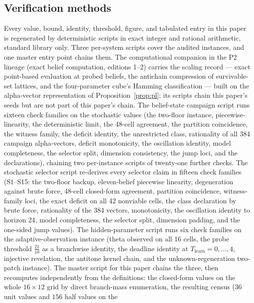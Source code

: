 \documentclass[10pt,twocolumn]{article}
\theoremstyle{plain}
\theoremstyle{definition}
\theoremstyle{remark}
\begin{document}
\subsection{Verification methods}\label{methods}

Every value, bound, identity, threshold, figure, and tabulated entry in
this paper is regenerated by deterministic scripts in exact integer and
rational arithmetic, standard library only. Three per-system scripts
cover the audited instances, and one master entry point chains them.
The computational companion in the P2 lineage (exact belief
computation, editions 1--2) carries the scaling record --- exact
point-based evaluation at probed beliefs, the antichain compression of
survivable-set lattices, and the four-parameter cube's Hamming
classification --- built on the alpha-vector representation of
Proposition~\ref{prop:pl}; its scripts chain this paper's seeds but
are not part of this paper's chain.
The belief-state campaign script runs sixteen check families on the
stochastic values (the two-floor instance, piecewise-linearity, the
deterministic limit, the 48-cell agreement, the partition coincidence,
the witness family, the deficit identity, the unrestricted class,
rationality of all 384 campaign alpha-vectors, deficit monotonicity, the
oscillation identity, model completeness, the selector split, dimension
consistency, the jump loci, and the declarations), chaining two
per-instance scripts of twenty-one further checks. The stochastic
selector script re-derives every selector claim in fifteen check
families (S1--S15: the two-floor backup, eleven-belief piecewise
linearity, degeneration against brute force, 48-cell closed-form
agreement, partition coincidence, witness-family loci, the exact
deficit on all 42 nonviable cells, the class declaration by brute
force, rationality of the 384 vectors, monotonicity, the oscillation
identity to horizon 24, model completeness, the selector split,
dimension padding, and the one-sided jump values). The hidden-parameter
script runs six check families on the adaptive-observation instance
(theta observed on all 16 cells, the probe threshold
\(\tfrac{21}{10}\) as a branchwise identity, the deadline identity at
\(T_{\mathrm{learn}} = 0, \dots, 4\), injective revelation, the
antitone kernel chain, and the unknown-regeneration two-patch
instance). The master script for this paper chains the three, then
recomputes independently from the definitions: the closed-form values on
the whole \(16 \times 12\) grid by direct branch-mass enumeration, the
resulting census (\(36\) unit values and \(156\) half values on the
\end{document}
